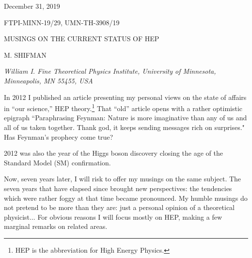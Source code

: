 \documentclass[epsfig,12pt]{article}
\begin{document}
\begin{flushright}

December 31, 2019


{\small FTPI-MINN-19/29,  UMN-TH-3908/19}

\end{flushright}

\bigskip

\begin{center}
{\large  MUSINGS ON THE CURRENT STATUS OF HEP}

\vspace{2mm}

M. SHIFMAN

\vspace{2mm}

{\em \small William I. Fine Theoretical Physics Institute, 
University of Minnesota,
 Minneapolis, MN 55455, USA}

\end{center}

\bigskip
\noindent
In 2012 I published an article \cite{impres} presenting my personal views on the state of affairs in ``our science,''  HEP theory.\footnote{HEP is the abbreviation for High Energy Physics.} That ``old'' article opens with a rather optimistic epigraph ``Paraphrasing Feynman: Nature is more  imaginative than any of us and all of us  taken together. Thank god, it keeps sending   messages rich on  surprises." Has Feynman's prophecy come true?

2012 was also the year of the Higgs boson discovery closing the age of the Standard Model (SM) confirmation. 

 Now, seven years later,  I will risk to offer my musings on the same subject. The seven years that have elapsed since \cite{impres} brought new perspectives:
the tendencies which  were rather foggy at that time became pronounced. My humble musings do not pretend to be more than they are: just a personal opinion of a theoretical physicist... For obvious reasons I will focus mostly on HEP, making a few marginal remarks on related areas. 
\end{document}

